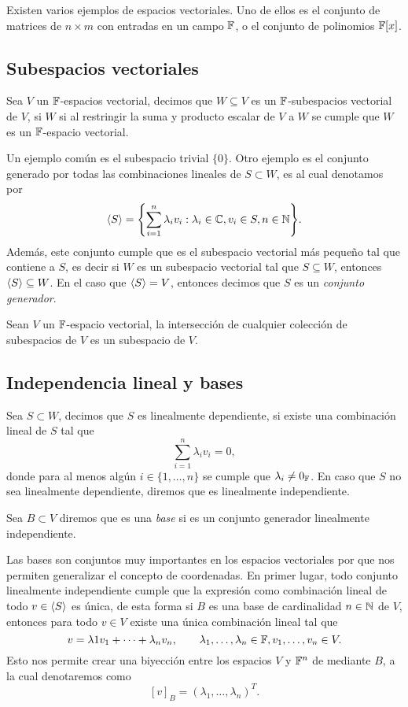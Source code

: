 Existen varios ejemplos de espacios vectoriales. Uno de ellos es el conjunto de matrices de $n \times m $ con entradas en un campo $\mathbb{F}$, o el conjunto de polinomios $\mathbb{F}[x]$.

\subsection{Subespacios vectoriales}

\begin{defi}
  Sea $V$ un $\mathbb{F}$-espacios vectorial, decimos que $W \subseteq V$ es un $\mathbb{F}$-subespacios vectorial de $V$, si $W$ si al restringir la suma y producto escalar de $V$ a $W$ se cumple que $W$ es un $\mathbb{F}$-espacio vectorial.
\end{defi}

Un ejemplo común es el subespacio trivial $\{0\}$. Otro ejemplo es el conjunto generado por todas las combinaciones lineales de $S \subset W$,  es al cual denotamos por
\[ \inner{S} = \set{ \sum_{i=1}^n \lambda_i v_i : \lambda_i \in \C, v_i \in S, n \in \N }. \]
Además, este conjunto cumple que es el subespacio vectorial más pequeño tal que contiene a $S$, es decir si $W$ es un subespacio vectorial tal que $S \subseteq W$, entonces $\langle S\rangle \subseteq W$. En el caso que $\langle S\rangle = V$, entonces decimos que $S$ es un \emph{conjunto generador}.

\begin{teor}
  Sean $V$ un $\mathbb{F}$-espacio vectorial, la intersección de cualquier colección de subespacios de $V$ es un subespacio de $V$.
\end{teor}

\subsection{Independencia lineal y bases}

\begin{defi}
  Sea $S \subset W$, decimos que $S$ es linealmente dependiente, si existe una combinación lineal de $S$ tal que
  \[ \sum_{i=1}^n \lambda_i v_i = 0, \]
  donde para al menos algún $i \in \{1,\ldots,n\}$ se cumple que $\lambda_i \neq 0_{\mathbb{F}}$. En caso que $S$ no sea linealmente dependiente, diremos que es linealmente independiente.

  Sea $B \subset V$ diremos que es una \emph{base} si es un conjunto generador linealmente independiente.
\end{defi}

Las bases son conjuntos muy importantes en los espacios vectoriales por que nos permiten generalizar el concepto de coordenadas. En primer lugar, todo conjunto linealmente independiente cumple que la expresión como combinación lineal de todo $v \in \langle S\rangle$ es única, de esta forma si $B$ es una base de cardinalidad $n \in \mathbb{N}$ de $V$, entonces para todo $v \in V$ existe una única combinación lineal tal que 
\[ v = \lambda 1 v_1 + \cdots + \lambda_n v_n, \qquad \lambda_1,\ldots,\lambda_n \in \mathbb{F}, v_1,\ldots,v_n \in V. \]
Esto nos permite crear una biyección entre los espacios $V$ y $\mathbb{F}^n$ de mediante $B$, a la cual denotaremos como
\[ [v]_B = (\lambda_1, \ldots, \lambda_n)^T.\]

